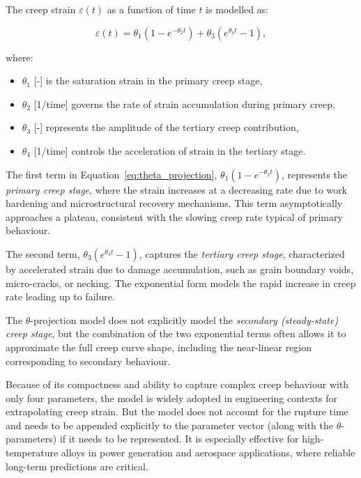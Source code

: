 \documentclass[class=scrbook, crop=false]{standalone}
\begin{document}
	The creep strain $\varepsilon(t)$ as a function of time $t$ is modelled as:
	
	\begin{equation}
	\varepsilon(t) = \theta_1 \left(1 - e^{-\theta_2 t}\right) + \theta_3 \left(e^{\theta_4 t} - 1\right),
	\label{eq:theta_projection}
	\end{equation}
	
	where:
	\begin{itemize}
		\item $\theta_1$ [-] is the saturation strain in the primary creep stage,
		\item $\theta_2$ [1/time] governs the rate of strain accumulation during primary creep,
		\item $\theta_3$ [-] represents the amplitude of the tertiary creep contribution,
		\item $\theta_4$ [1/time] controls the acceleration of strain in the tertiary stage.
	\end{itemize}
	
	The first term in Equation~\ref{eq:theta_projection}, $\theta_1 (1 - e^{-\theta_2 t})$, represents the \textit{primary creep stage}, where the strain increases at a decreasing rate due to work hardening and microstructural recovery mechanisms. This term asymptotically approaches a plateau, consistent with the slowing creep rate typical of primary behaviour.
	
	The second term, $\theta_3 (e^{\theta_4 t} - 1)$, captures the \textit{tertiary creep stage}, characterized by accelerated strain due to damage accumulation, such as grain boundary voids, micro-cracks, or necking. The exponential form models the rapid increase in creep rate leading up to failure.
	
	The $\theta$-projection model does not explicitly model the \textit{secondary (steady-state) creep stage}, but the combination of the two exponential terms often allows it to approximate the full creep curve shape, including the near-linear region corresponding to secondary behaviour.
	
	Because of its compactness and ability to capture complex creep behaviour with only four parameters, the model is widely adopted in engineering contexts for extrapolating creep strain. But the model does not account for the rupture time and needs to be appended explicitly to the parameter vector (along with the $\theta$-parameters) if it needs to be represented. It is especially effective for high-temperature alloys in power generation and aerospace applications, where reliable long-term predictions are critical.	
	
\end{document}
